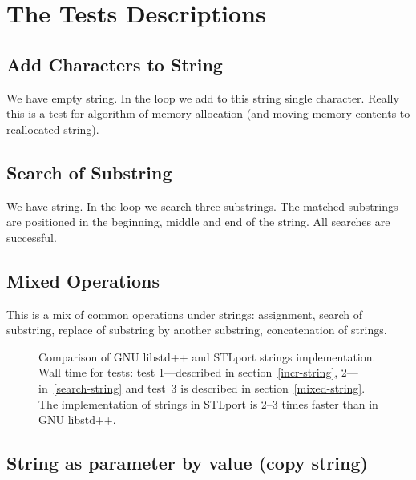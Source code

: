 \documentclass[a4paper]{article}
\providecommand{\STLport}{{\fontfamily{cmss}\selectfont STLport}}
\providecommand{\libstd}{{\fontfamily{cmtt}\selectfont GNU \mbox{libstd++}}}
\begin{document}
\section{The Tests Descriptions\label{TestsDescr}}

\subsection{Add Characters to String\label{incr-string}}

We have empty string. In the loop we add to this string single
character.
Really this is a test for algorithm
of memory allocation (and moving memory contents to reallocated string).



\subsection{Search of Substring\label{search-string}}

We have string. In the loop we search three substrings.
The matched substrings are positioned in
the beginning, middle and end of the string. All searches are
successful.



\subsection{Mixed Operations\label{mixed-string}}

This is a mix of common operations under strings: assignment,
search of substring, replace of substring by another substring,
concatenation of strings.



\begin{figure}
  \begin{center}
    
  \end{center}
  \caption{Comparison of \libstd{} and \STLport{}
           strings implementation. Wall time for tests:
           test 1---described in section~\ref{incr-string},
           2---in~\ref{search-string} and
           test~3 is described in section~\ref{mixed-string}.
           The implementation of strings in \STLport{}
           is 2--3 times faster than in \libstd.
           \label{STLport-gpp-strings}}
\end{figure}

\subsection{String as parameter by value (copy string)\label{params-string}}
\end{document}
